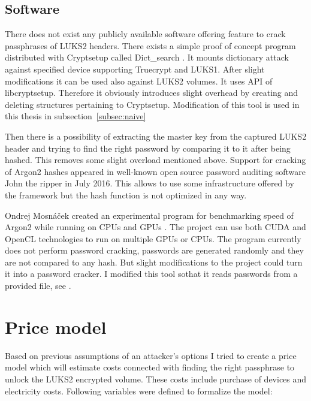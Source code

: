 \documentclass[nolof]{fithesis3}
\begin{document}
\subsection{Software}
There does not exist any publicly available software offering feature to crack passphrases of LUKS2 headers. There exists a simple proof of concept program distributed with Cryptsetup called Dict\_search \parencite{cryptsetupdictsearch}. It mounts dictionary attack against specified device supporting Truecrypt and LUKS1. After slight modifications it can be used also against LUKS2 volumes. It uses API of libcryptsetup. Therefore it obviously introduces slight overhead by creating and deleting structures pertaining to Cryptsetup. Modification of this tool is used in this thesis in subsection~\ref{subsec:naive}

Then there is a possibility of extracting the master key from the captured LUKS2 header and trying to find the right password by comparing it to it after being hashed. This removes some slight overload mentioned above. Support for cracking of Argon2 hashes appeared in well-known open source password auditing software John the ripper in July 2016. This allows to use some infrastructure offered by the framework but the hash function is not optimized in any way.

Ondrej Mosnáček created an experimental program for benchmarking speed of Argon2 while running on CPUs and GPUs \parencite{argon2gpu}. The project can use both CUDA and OpenCL technologies to run on multiple GPUs or CPUs. The program currently does not perform password cracking, passwords are generated randomly and they are not compared to any hash. But slight modifications to the project could turn it into a password cracker. I modified this tool sothat it reads passwords from a provided file, see \parencite{argon2gpuvojta}.

\section{Price model}
\label{sec:model}
Based on previous assumptions of an attacker's options I tried to create a price model which will estimate costs connected with finding the right passphrase to unlock the LUKS2 encrypted volume. These costs include purchase of devices and electricity costs. Following variables were defined to formalize the model:
\end{document}
